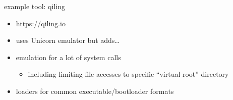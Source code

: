 \begin{frame}{example tool: qiling}
    \begin{itemize}
    \item https://qiling.io
    \item uses Unicorn emulator but adds\ldots
    \item emulation for a lot of system calls
        \begin{itemize}
        \item including limiting file accesses to specific ``virtual root'' directory
        \end{itemize}
    \item loaders for common executable/bootloader formats
    \end{itemize}
\end{frame}


